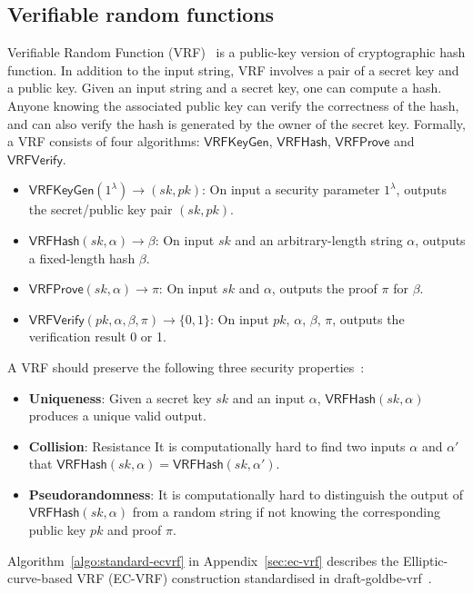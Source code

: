 \subsection{Verifiable random functions}

Verifiable Random Function (VRF)~\cite{micali1999verifiable} is a public-key version of cryptographic hash function.
In addition to the input string, VRF involves a pair of a secret key and a public key.
Given an input string and a secret key, one can compute a hash.
Anyone knowing the associated public key can verify the correctness of the hash, and can also verify the hash is generated by the owner of the secret key.
Formally, a VRF consists of four algorithms: $\mathsf{VRFKeyGen}$, $\mathsf{VRFHash}$, $\mathsf{VRFProve}$ and $\mathsf{VRFVerify}$.

\begin{itemize}
    \item $\mathsf{VRFKeyGen}(1^{\lambda}) \to (sk, pk)$: On input a security parameter $1^{\lambda}$, outputs the secret/public key pair $(sk, pk)$.
    \item $\mathsf{VRFHash}(sk, \alpha) \to \beta $: On input $sk$ and an arbitrary-length string $\alpha$, outputs a fixed-length hash $\beta$.
    \item $\mathsf{VRFProve}(sk, \alpha) \to \pi$: On input $sk$ and $\alpha$, outputs the proof $\pi$ for $\beta$.
    \item $\mathsf{VRFVerify}(pk, \alpha, \beta, \pi) \to \{0, 1\}$: On input $pk$, $\alpha$, $\beta$, $\pi$, outputs the verification result 0 or 1.
\end{itemize}

A VRF should preserve the following three security properties~\cite{goldberg2017draft}:

\begin{itemize}
    \item \textbf{Uniqueness}: Given a secret key $sk$ and an input $\alpha$, $\mathsf{VRFHash}(sk, \alpha)$ produces a unique valid output.
    \item \textbf{Collision}: Resistance It is computationally hard to find two inputs $\alpha$ and $\alpha'$ that $\mathsf{VRFHash}(sk, \alpha) = \mathsf{VRFHash}(sk, \alpha')$.
    \item \textbf{Pseudorandomness}: It is computationally hard to distinguish the output of $\mathsf{VRFHash}(sk, \alpha)$ from a random string if not knowing the corresponding public key $pk$ and proof $\pi$.
\end{itemize}

Algorithm~\ref{algo:standard-ecvrf} in Appendix~\ref{sec:ec-vrf} describes the Elliptic-curve-based VRF (EC-VRF) construction standardised in draft-goldbe-vrf~\cite{goldberg2017draft}.
